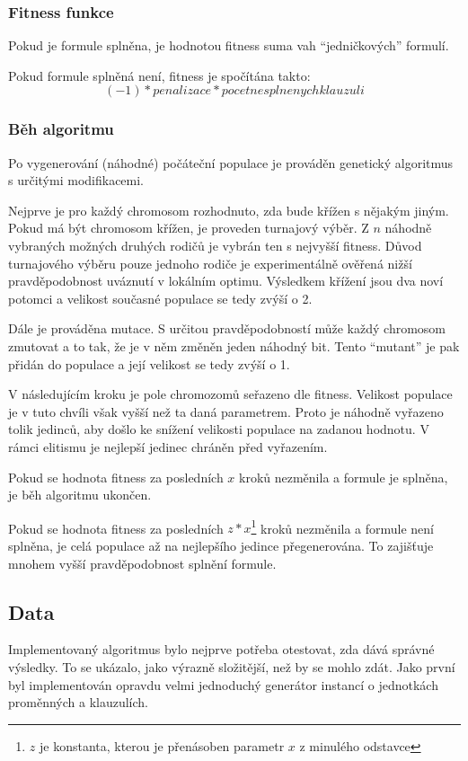 \documentclass[a4paper]{article}
\begin{document}
		\subsubsection{Fitness funkce}
			Pokud je formule splněna, je hodnotou fitness suma vah \enquote{jedničkových} formulí.
			
			Pokud formule splněná není, fitness je spočítána takto: $$(-1) * penalizace * pocet nesplnenych klauzuli$$
		
		\subsubsection{Běh algoritmu}
			Po vygenerování (náhodné) počáteční populace	je prováděn genetický algoritmus s určitými modifikacemi.
		
			Nejprve je pro každý chromosom rozhodnuto, zda bude křížen s nějakým jiným. Pokud má být chromosom křížen, je proveden turnajový výběr. Z $n$ náhodně vybraných možných druhých rodičů je vybrán ten s nejvyšší fitness. Důvod turnajového výběru pouze jednoho rodiče je experimentálně ověřená nižší pravděpodobnost uváznutí v lokálním optimu. Výsledkem křížení jsou dva noví potomci a velikost současné populace se tedy zvýší o 2.
		
			Dále je prováděna mutace. S určitou pravděpodobností může každý chromosom zmutovat a to tak, že je v něm změněn jeden náhodný bit. Tento \enquote{mutant} je pak přidán do populace a její velikost se tedy zvýší o 1.
		
			V následujícím kroku je pole chromozomů seřazeno dle fitness. Velikost populace je v tuto chvíli však vyšší než ta daná parametrem. Proto je náhodně vyřazeno tolik jedinců, aby došlo ke snížení velikosti populace na zadanou hodnotu. V rámci elitismu je nejlepší jedinec chráněn před vyřazením.
			
			Pokud se hodnota fitness za posledních $x$ kroků nezměnila a formule je splněna, je běh algoritmu ukončen.
			
			Pokud se hodnota fitness za posledních $z * x$\footnote{$z$ je konstanta, kterou je přenásoben parametr $x$ z minulého odstavce} kroků nezměnila a formule není splněna, je celá populace až na nejlepšího jedince přegenerována. To zajišťuje mnohem vyšší pravděpodobnost splnění formule.
		
	\subsection{Data}
		Implementovaný algoritmus bylo nejprve potřeba otestovat, zda dává správné výsledky. To se ukázalo, jako výrazně složitější, než by se mohlo zdát. Jako první byl implementován opravdu velmi jednoduchý generátor instancí o jednotkách proměnných a klauzulích.
		
\end{document}
